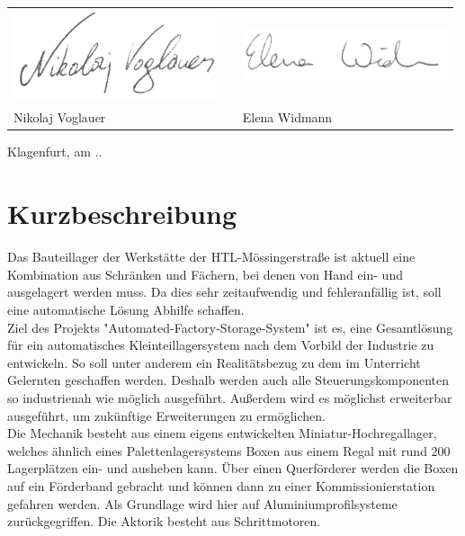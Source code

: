 \documentclass[12pt, twoside]{article}
\newcommand{\todayD}{\the\day.\the\month.\the\year}
\begin{document}
\begin{center}
    
    \begin{tabular}{P{67mm}cP{67mm}}
        \includegraphics[width=60mm]{sign_voglauer.png} & & \includegraphics[width=60mm]{sign_widmann.jpg} \\
        Nikolaj Voglauer & & Elena Widmann\\
    \end{tabular}

    \vspace*{\fill}
    \raggedleft Klagenfurt, am \todayD

\end{center}

\newpage

\pagestyle{fancy}
\normalsize

\section*{Kurzbeschreibung}

Das Bauteillager der Werkstätte der HTL-Mössingerstraße ist aktuell eine Kombination aus Schränken und Fächern, bei denen von Hand ein- und ausgelagert werden muss. Da dies sehr zeitaufwendig und fehleranfällig ist, soll eine automatische Lösung Abhilfe schaffen. \\

Ziel des Projekts "Automated-Factory-Storage-System" ist es, eine Gesamtlösung für ein automatisches Kleinteillagersystem nach dem Vorbild der Industrie zu entwickeln. So soll unter anderem ein Realitätsbezug zu dem im Unterricht Gelernten geschaffen werden. Deshalb werden auch alle Steuerungskomponenten so industrienah wie möglich ausgeführt. Außerdem wird es möglichst erweiterbar ausgeführt, um zukünftige Erweiterungen zu ermöglichen.\\

Die Mechanik besteht aus einem eigens entwickelten Miniatur-Hochregallager, welches ähnlich eines Palettenlagersystems Boxen aus einem Regal mit rund 200 Lagerplätzen ein- und ausheben kann. Über einen Querförderer werden die Boxen auf ein Förderband gebracht und können dann zu einer Kommissionierstation gefahren werden. Als Grundlage wird hier auf Aluminiumprofilsysteme zurückgegriffen. Die Aktorik besteht aus Schrittmotoren.\\
\end{document}
